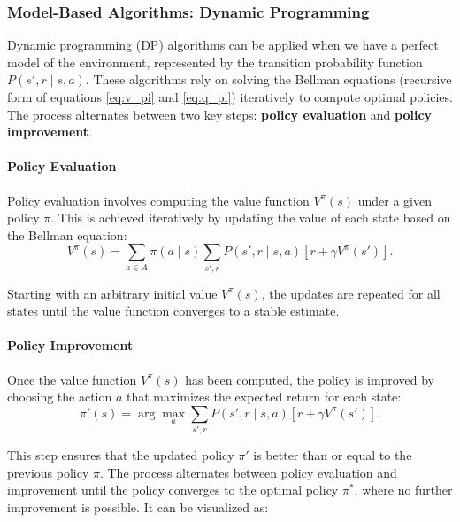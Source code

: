 \subsubsection{\textbf{Model-Based Algorithms: Dynamic Programming}}

\hspace{1em} Dynamic programming (DP) algorithms can be applied when we have a perfect model
of the environment, represented by the transition probability function \( P(s',
r \mid s, a) \). These algorithms rely on solving the Bellman equations
(recursive form of equations \ref{eq:v_pi} and \ref{eq:q_pi}) iteratively to
compute optimal policies. The process alternates between two key steps:
\textbf{policy evaluation} and \textbf{policy improvement}.

\paragraph{Policy Evaluation}
Policy evaluation involves computing the value function \( V^\pi(s) \) under a
given policy \( \pi \). This is achieved iteratively by updating the value of
each state based on the Bellman equation:
\begin{equation}
    V^\pi(s) = \sum_{a \in A} \pi(a \mid s) \sum_{s', r} P(s', r \mid s, a) \left[ r + \gamma V^\pi(s') \right].
\end{equation}

Starting with an arbitrary initial value \( V^\pi(s) \), the updates are
repeated for all states until the value function converges to a stable
estimate.

\paragraph{Policy Improvement}
Once the value function \( V^\pi(s) \) has been computed, the policy is
improved by choosing the action \( a \) that maximizes the expected return for
each state:
\begin{equation}
    \pi'(s) = \arg\max_a \sum_{s', r} P(s', r \mid s, a) \left[ r + \gamma V^\pi(s') \right].
\end{equation}

This step ensures that the updated policy \( \pi' \) is better than or equal to
the previous policy \( \pi \). The process alternates between policy evaluation
and improvement until the policy converges to the optimal policy \( \pi^* \),
where no further improvement is possible. It can be visualized as:

